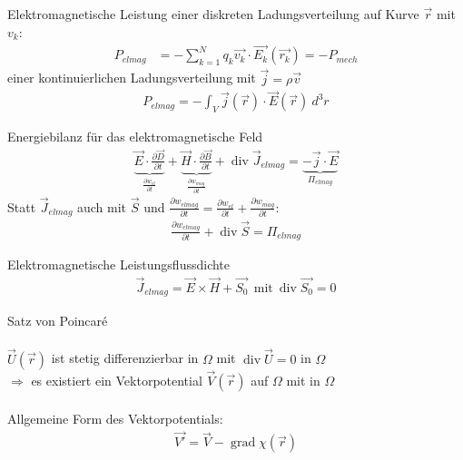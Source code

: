 \documentclass[a6paper]{kartei}
\begin{document}
  
\begin{karte}{Elektromagnetische Leistung }
einer diskreten Ladungsverteilung auf Kurve $\vec r$ mit $v_k$:
 \begin{eqnarray*}
  P_{elmag} & =  - \sum_{k=1}^{N} q_{k} \vec{v_{k}} \cdot \vec{E_{k}}(\vec{r_{k}}) = - P_{mech}
 \end{eqnarray*}
einer kontinuierlichen Ladungsverteilung mit $\vec j = \rho \vec v$ 
 \begin{eqnarray*}
  P_{elmag} = - \int_{V} \vec{j}(\vec{r}) \cdot \vec{E}(\vec{r}) \ d^{3}r
 \end{eqnarray*}

\end{karte}


\begin{karte}{Energiebilanz für das elektromagnetische Feld}
 \begin{eqnarray*}
  \underbrace{\vec{E} \cdot \frac{\partial \vec{D}}{\partial t}}_{\frac{\partial w_{el}}{\partial t}} + 
  \underbrace{\vec{H} \cdot \frac{\partial \vec{B}}{\partial t}}_{\frac{\partial w_{mag}}{\partial t}}
   + \operatorname{div} \vec{J}_{elmag} = \underbrace{-\vec{j} \cdot \vec{E}}_{\Pi_{elmag}}  
 \end{eqnarray*}
Statt $\vec J_{elmag}$ auch mit $\vec S$ und  $\frac{\partial w_{elmag}}{\partial t}=\frac{\partial w_{el}}{\partial t}+\frac{\partial w_{mag}}{\partial t}$: 
 \begin{eqnarray*}
 \frac{\partial w_{elmag}}{\partial t}    + \operatorname{div} \vec{S} =\Pi_{elmag}  
 \end{eqnarray*}
\end{karte}


\begin{karte}{Elektromagnetische Leistungsflussdichte} 
 \begin{eqnarray*}
  \vec{J}_{elmag} = \vec{E} \times \vec{H} + \vec{S_{0}} \ \ \text{mit} \ \operatorname{div} \vec{S_{0}} = 0 
 \end{eqnarray*}
\end{karte}



\begin{karte}{Satz von Poincaré}
 \ \\ \ \\$\vec{U}(\vec{r})$ ist stetig differenzierbar in $\Omega$ mit $\operatorname{div} \vec{U} = 0$ in $\Omega$\\$ \Rightarrow$ es 
existiert ein Vektorpotential $\vec{V}(\vec{r})$ auf $\Omega$ mit  in $\Omega$ 
\\\ \\Allgemeine Form des Vektorpotentials:
 \begin{eqnarray*}
  \vec{V'} = \vec{V} - \operatorname{grad} \chi(\vec{r})
 \end{eqnarray*}
\end{karte}
\end{document}
